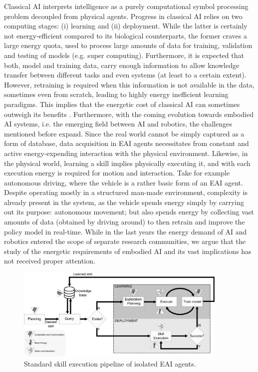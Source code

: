 Classical AI interprets intelligence as a purely computational symbol processing problem decoupled from physical agents. Progress in classical AI relies on two computing stages: (i) learning and (ii) deployment. While the latter is certainly not energy-efficient compared to its biological counterparts, the former craves a large energy quota, used to process large amounts of data for training, validation and testing of models (e.g. super computing). Furthermore, it is expected that both, model and training data, carry enough information to allow knowledge transfer between different tasks and even systems (at least to a certain extent). However, retraining is required when this information is not available in the data, sometimes even from scratch, leading to highly energy inefficient learning paradigms. This implies that the energetic cost of classical AI can sometimes outweigh its benefits \cite{Strubell2019EnergyAP}. Furthermore, with the coming evolution towards embodied AI systems, i.e. the emerging field between AI and robotics, the challenges mentioned before expand. Since the real world cannot be simply captured as a form of database, data acquisition in EAI agents necessitates from constant and active energy-expending interaction with the physical environment. Likewise, in the physical world, learning a skill implies physically executing it, and with each execution energy is required for motion and interaction. Take for example autonomous driving, where the vehicle is a rather basic form of an EAI agent. Despite operating mostly in a structured man-made environment, complexity is already present in the system, as the vehicle spends energy simply by carrying out its purpose: autonomous movement; but also spends energy by collecting vast amounts of data (obtained by driving around) to then retrain and improve the policy model in real-time. While in the last years the energy demand of AI and robotics entered the scope of separate research communities, we argue that the study of the energetic requirements of embodied AI and its vast implications has not received proper attention. 
\begin{figure}[!t]
	\centering
	\includegraphics[width=0.9\textwidth]{fig/embodied_ai_learning_pipeline_v7.pdf}
	\caption{Standard skill execution pipeline of isolated EAI agents.}
	\label{fig:embodied_ai_pipeline}
\end{figure}
